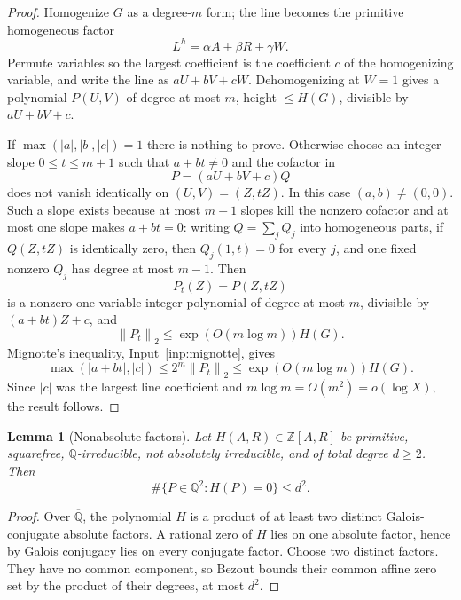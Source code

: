 \documentclass[11pt]{article}
\newtheorem{lemma}[theorem]{Lemma}
\theoremstyle{definition}
\newcommand{\Z}{\mathbb Z}
\newcommand{\Q}{\mathbb Q}
\newcommand{\norm}[1]{\left\|#1\right\|}
\newcommand{\1}{\mathbf 1}
\begin{document}
\begin{proof}
Homogenize \(G\) as a degree-\(m\) form; the line becomes the
primitive homogeneous factor
\[
  L^h=\alpha A+\beta R+\gamma W.
\]
Permute variables so the largest coefficient is the coefficient \(c\) of the
homogenizing variable, and write the line as \(aU+bV+cW\).  Dehomogenizing at
\(W=1\) gives a polynomial \(P(U,V)\) of degree at most \(m\), height
\(\le H(G)\), divisible by \(aU+bV+c\).

If \(\max(|a|,|b|,|c|)=1\) there is nothing to prove.  Otherwise choose an
integer slope \(0\le t\le m+1\) such that \(a+bt\ne0\) and the cofactor in
\[
  P=(aU+bV+c)Q
\]
does not vanish identically on \((U,V)=(Z,tZ)\).  In this case
\((a,b)\ne(0,0)\).  Such a slope exists because at most \(m-1\) slopes kill
the nonzero cofactor and at most one slope makes \(a+bt=0\): writing
\(Q=\sum_j Q_j\) into homogeneous parts, if \(Q(Z,tZ)\) is identically zero,
then \(Q_j(1,t)=0\) for every \(j\), and one fixed nonzero \(Q_j\) has degree
at most \(m-1\).  Then
\[
  P_t(Z)=P(Z,tZ)
\]
is a nonzero one-variable integer polynomial of degree at most \(m\), divisible
by \((a+bt)Z+c\), and
\[
  \norm{P_t}_2\le \exp(O(m\log m))H(G).
\]
Mignotte's inequality, Input~\ref{inp:mignotte}, gives
\[
  \max(|a+bt|,|c|)\le 2^m\norm{P_t}_2
  \le\exp(O(m\log m))H(G).
\]
Since \(|c|\) was the largest line coefficient and
\(m\log m=O(m^2)=o(\log X)\), the result follows.
\end{proof}

\begin{lemma}[Nonabsolute factors]\label{lem:nonabsolute}
Let \(H(A,R)\in\Z[A,R]\) be primitive, squarefree, \(\Q\)-irreducible, not
absolutely irreducible, and of total degree \(d\ge2\).  Then
\[
  \#\{P\in\Q^2:H(P)=0\}\le d^2.
\]
\end{lemma}

\begin{proof}
Over \(\overline{\Q}\), the polynomial \(H\) is a product of at least two
distinct Galois-conjugate absolute factors.  A rational zero of \(H\) lies on
one absolute factor, hence by Galois conjugacy lies on every conjugate factor.
Choose two distinct factors.  They have no common component, so Bezout bounds
their common affine zero set by the product of their degrees, at most \(d^2\).
\end{proof}
\end{document}
